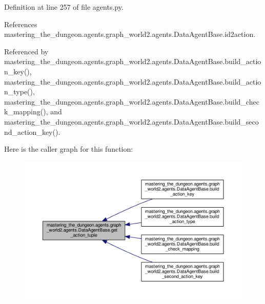 Definition at line 257 of file agents.\+py.



References mastering\+\_\+the\+\_\+dungeon.\+agents.\+graph\+\_\+world2.\+agents.\+Data\+Agent\+Base.\+id2action.



Referenced by mastering\+\_\+the\+\_\+dungeon.\+agents.\+graph\+\_\+world2.\+agents.\+Data\+Agent\+Base.\+build\+\_\+action\+\_\+key(), mastering\+\_\+the\+\_\+dungeon.\+agents.\+graph\+\_\+world2.\+agents.\+Data\+Agent\+Base.\+build\+\_\+action\+\_\+type(), mastering\+\_\+the\+\_\+dungeon.\+agents.\+graph\+\_\+world2.\+agents.\+Data\+Agent\+Base.\+build\+\_\+check\+\_\+mapping(), and mastering\+\_\+the\+\_\+dungeon.\+agents.\+graph\+\_\+world2.\+agents.\+Data\+Agent\+Base.\+build\+\_\+second\+\_\+action\+\_\+key().

Here is the caller graph for this function\+:
\nopagebreak
\begin{figure}[H]
\begin{center}
\leavevmode
\includegraphics[width=350pt]{classmastering__the__dungeon_1_1agents_1_1graph__world2_1_1agents_1_1DataAgentBase_aa279284791dda3df9c07a8ad036a1f2e_icgraph}
\end{center}
\end{figure}
\mbox{\label{classmastering__the__dungeon_1_1agents_1_1graph__world2_1_1agents_1_1DataAgentBase_a12d7c1414638f97db8b7388c3121d951}} 
